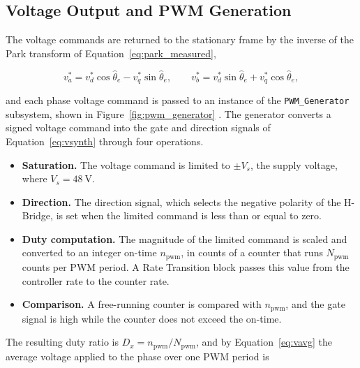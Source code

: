 
\subsection{Voltage Output and PWM Generation}\label{sec:voltageOutput}

The voltage commands are returned to the stationary frame by the inverse of the Park transform of Equation~\eqref{eq:park_measured},

\begin{equation}
	v_a^{*} = v_d^{*} \cos\hat{\theta}_e - v_q^{*} \sin\hat{\theta}_e,
	\qquad
	v_b^{*} = v_d^{*} \sin\hat{\theta}_e + v_q^{*} \cos\hat{\theta}_e,
	\label{eq:inverse_park}
\end{equation}

and each phase voltage command is passed to an instance of the
\texttt{PWM\_Generator} subsystem, shown in Figure~\ref{fig:pwm_generator} %
. The generator converts a signed voltage command into the gate and
direction signals of Equation~\eqref{eq:vsynth} through four operations.

\begin{itemize}
	\item \textbf{Saturation.} The voltage command is limited to $\pm V_s$, the supply voltage, where $V_s =\SI{48}{\volt}$.
	
	\item \textbf{Direction.} The direction signal, which selects the negative polarity of the H-Bridge, is set when the limited command is less than or equal to zero.
	
	\item \textbf{Duty computation.} The magnitude of the limited command is scaled and converted to an integer on-time $n_{\mathrm{pwm}}$, in counts of a counter that runs $N_{\mathrm{pwm}}$ counts per PWM period. A Rate Transition block passes this value from the controller rate to the counter rate.
	
	\item \textbf{Comparison.} A free-running counter is compared with $n_{\mathrm{pwm}}$, and the gate signal is high while the counter does not exceed the on-time.
\end{itemize}


The resulting duty ratio is $D_x = n_{\mathrm{pwm}} / N_{\mathrm{pwm}}$, and
by Equation~\eqref{eq:vavg} the average voltage applied to the phase over one
PWM period is

